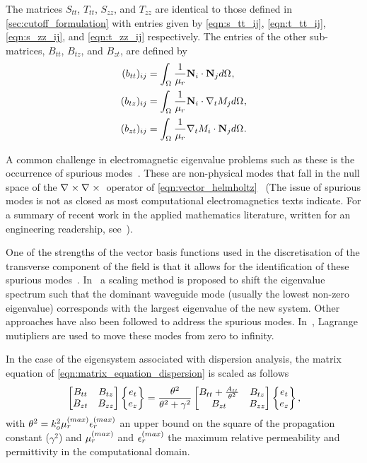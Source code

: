 The matrices $S_{tt}$, $T_{tt}$, $S_{zz}$, and $T_{zz}$ are identical
to those defined in \ref{sec:cutoff_formulation} with entries given by
\eqref{eqn:s_tt_ij}, \eqref{eqn:t_tt_ij}, \eqref{eqn:s_zz_ij}, and \eqref{eqn:t_zz_ij} respectively.  
The entries of the other sub-matrices, $B_{tt}$, $B_{tz}$, and
$B_{zt}$, are defined by
\begin{align}
(b_{tt})_{ij} &=
\intoverdomain{\inv{\ur}\field{N}_i\cdot\field{N}_j}{\Domain{}},\\
(b_{tz})_{ij} &=
\intoverdomain{\inv{\ur}\field{N}_i\cdot\del{M_j}{t}}{\Domain{}},\\
(b_{zt})_{ij} &=
\intoverdomain{\inv{\ur}\del{M_i}{t}\cdot\field{N}_j}{\Domain{}}.
\end{align}

A common challenge in electromagnetic eigenvalue problems such as
these is the occurrence of spurious
modes~\cite{Dav2005}.  These are non-physical
modes that fall in the null space of the $\curl{\curl{}{}}{}$ operator
of \eqref{eqn:vector_helmholtz}~\cite{Bos1998} (The issue of spurious
modes is not as closed as most computational electromagnetics texts
indicate. For a summary of recent work in the applied mathematics
literature, written for an engineering readership,
see~\cite{FerRaf2002}).

One of the strengths of the vector basis functions used in the
discretisation of the transverse component of the field is that it
allows for the identification of these spurious modes~\cite{Dav2005,
Jin2002}.  In~\cite{LeeSun1991} a scaling method is proposed to shift
the eigenvalue spectrum such that the dominant waveguide mode (usually
the lowest non-zero eigenvalue) corresponds with the largest
eigenvalue of the new system. Other approaches have also been followed
to address the spurious modes. In~\cite{VarDem2002}, Lagrange
mutipliers are used to move these modes from zero to infinity.

In the case of the eigensystem associated with dispersion analysis,
the matrix equation of \eqref{eqn:matrix_equation_dispersion} is
scaled as follows
\begin{equation}
    \label{eqn:matrix_equation_dispersion_scaled}
    \twobytwo{B_{tt}}{B_{tz}}{B_{zt}}{B_{zz}}\twobyone{e_t}{e_z} =
    \frac{\theta^2}{\theta^2 +
    \gamma^2}\twobytwo{B_{tt} +
    \frac{A_{tt}}{\theta^2}}{B_{tz}}{B_{zt}}{B_{zz}}\twobyone{e_t}{e_z},
\end{equation}
with $\theta^2 = \ko{o}{2}\ur^{(max)}\er^{(max)}$ an upper bound on
the square of the propagation constant ($\gamma^2$) and $\ur^{(max)}$
and $\er^{(max)}$ the maximum relative permeability and permittivity
in the computational domain.

